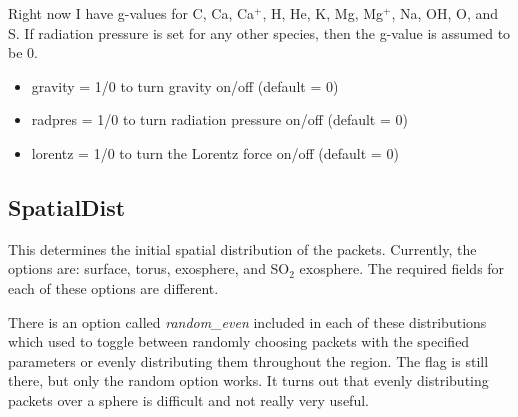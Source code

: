 \documentclass[11pt]{article}
\begin{document}
Right now I have g-values for C, Ca, Ca$^+$, H, He, K, Mg, Mg$^+$, Na, OH, O, 
and S. If radiation pressure is set for any other species, then the g-value is 
assumed to be 0.

\begin{itemize}
\item {\color{red}gravity} = 1/0 to turn gravity on/off (default = 0)
\item {\color{red}radpres} = 1/0 to turn radiation pressure on/off (default = 0)
\item {\color{red}lorentz} = 1/0 to turn the Lorentz force on/off (default = 0)
\end{itemize}

\subsection{SpatialDist}

This determines the initial spatial distribution of the packets. Currently, the 
options are: surface, torus, exosphere, and SO$_2$ exosphere. The required 
fields for each of these options are different.

There is an option called \textit{random\_even} included in each of these
distributions which used to toggle between randomly choosing packets with the
specified parameters or evenly distributing them throughout the region. The
flag is still there, but only the random option works. It turns out that evenly
distributing packets over a sphere is difficult and not really very useful.
\end{document}
